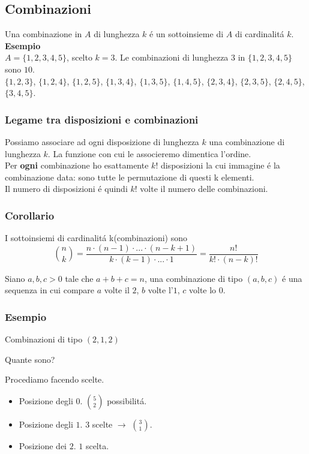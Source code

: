 \documentclass[11pt]{article}
\begin{document}
            \subsection{Combinazioni}
            Una combinazione in $A$ di lunghezza $k$ \'e un sottoinsieme di $A$ di cardinalit\'a $k$.\\
            \textbf{Esempio}\\
            $A=\{1,2,3,4,5\}$, scelto $k=3$. Le combinazioni di lunghezza 3 in $\{1,2,3,4,5\}$ sono $10$.\\
            $\{1,2,3\}$, $\{1,2,4\}$, $\{1,2,5\}$, $\{1,3,4\}$, $\{1,3,5\}$, $\{1,4,5\}$, $\{2,3,4\}$, $\{2,3,5\}$, $\{2,4,5\}$, $\{3,4,5\}$.
            \subsubsection{Legame tra disposizioni e combinazioni}
            Possiamo associare ad ogni disposizione di lunghezza $k$ una combinazione di lunghezza $k$. La funzione con cui le associeremo dimentica l'ordine.\\
            Per \textbf{ogni} combinazione ho esattamente $k!$ disposizioni la cui immagine \'e la combinazione data: sono tutte le permutazione di questi k elementi.\\
            Il numero di disposizioni \'e quindi $k!$ volte il numero delle combinazioni.
			\subsubsection{Corollario}
			I sottoinsiemi di cardinalit\'a k(combinazioni) sono \\ \[\binom{n}{k}=\frac{n\cdot(n-1)\cdot...\cdot(n-k+1)}{k\cdot(k-1)\cdot...\cdot1}=\frac{n!}{k!\cdot(n-k)!}\]
			
			Siano $a,b,c > 0$ tale che $a+b+c=n$, una combinazione di tipo
			$(a,b,c)$ \'e una sequenza in cui compare $a$ volte il $2$,
			$b$ volte l'$1$, $c$ volte lo $0$.

			\subsubsection{Esempio}

			Combinazioni di tipo $(2,1,2)$

			Quante sono?

			Procediamo facendo scelte.\begin{itemize}

				\item Posizione degli $0$. $\binom{5}{2}$ possibilit\'a.
				\item Posizione degli $1$. $3$ scelte $\to$ $\binom{3}{1}$.
				\item Posizione dei $2$. $1$ scelta.
			\end{itemize}
\end{document}
